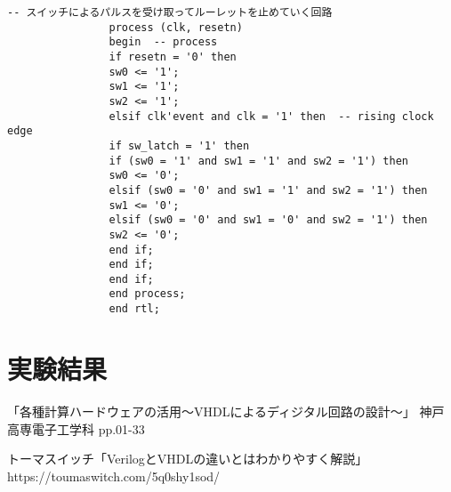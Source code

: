 \documentclass{ltjsarticle}
\begin{document}
\begin{lstlisting}[caption=sample8, label=sample8]
				-- スイッチによるパルスを受け取ってルーレットを止めていく回路
				process (clk, resetn)
				begin  -- process
				if resetn = '0' then
				sw0 <= '1';
				sw1 <= '1';
				sw2 <= '1';
				elsif clk'event and clk = '1' then  -- rising clock edge
				if sw_latch = '1' then
				if (sw0 = '1' and sw1 = '1' and sw2 = '1') then
				sw0 <= '0';
				elsif (sw0 = '0' and sw1 = '1' and sw2 = '1') then
				sw1 <= '0';
				elsif (sw0 = '0' and sw1 = '0' and sw2 = '1') then
				sw2 <= '0';
				end if;
				end if;
				end if;
				end process;
				end rtl;

			\end{lstlisting}

		\section{実験結果}
\begin{thebibliography}{99}
「各種計算ハードウェアの活用～VHDLによるディジタル回路の設計～」
神戸高専電子工学科 pp.01-33

トーマスイッチ「VerilogとVHDLの違いとはわかりやすく解説」
https://toumaswitch.com/5q0shy1sod/
\end{thebibliography}
\end{document}
